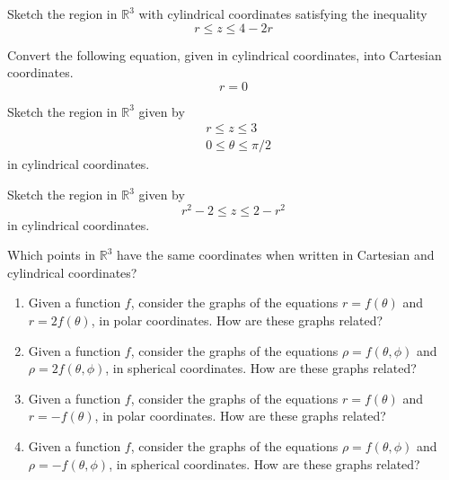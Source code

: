 \documentclass{ximera}
\begin{document}
\begin{problem}
Sketch the region in $\mathbb{R}^3$ with cylindrical coordinates satisfying the inequality
\[
r\leq z \leq 4-2r
\]
\end{problem}

\begin{problem}
Convert the following equation, given in cylindrical coordinates, into Cartesian coordinates.
\[
r = 0
\]
\end{problem}

\begin{problem}
Sketch the region in $\mathbb{R}^3$ given by
\begin{align*}
&r\leq z\leq 3\\
&0\leq\theta \leq\pi/2
\end{align*}
in cylindrical coordinates.
\end{problem}

\begin{problem}
\begin{problem}
Sketch the region in $\mathbb{R}^3$ given by
\[
r^2-2\leq z\leq 2-r^2
\]
in cylindrical coordinates.
\end{problem}
\end{problem}

\begin{problem}
Which points in $\mathbb{R}^3$ have the same coordinates when written in Cartesian and cylindrical coordinates?
\end{problem}

\begin{problem}
\begin{enumerate}
\item Given a function $f$, consider the graphs of the equations $r = f(\theta)$ and $r = 2f(\theta)$, in polar coordinates. How are these graphs related?
\item Given a function $f$, consider the graphs of the equations $\rho = f(\theta, \phi)$ and $\rho = 2f(\theta, \phi)$, in spherical coordinates. How are these graphs related?
\item Given a function $f$, consider the graphs of the equations $r = f(\theta)$ and $r = -f(\theta)$, in polar coordinates. How are these graphs related?
\item Given a function $f$, consider the graphs of the equations $\rho = f(\theta, \phi)$ and $\rho = -f(\theta, \phi)$, in spherical coordinates. How are these graphs related?
\end{enumerate}
\end{problem}
\end{document}
